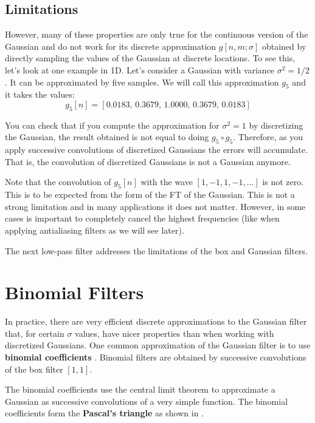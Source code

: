 \subsection{Limitations}

However, many of these properties are only true for the continuous version of the Gaussian and do not work for its discrete approximation $g\left[n,m;\sigma \right]$ obtained by directly sampling the values of the Gaussian at discrete locations. To see this, let's look at one example in 1D. Let's consider a Gaussian with variance $\sigma^2=1/2$. It can be approximated by five samples. We will call this approximation $g_5$ and it takes the values:
\begin{equation}
	g_5\left[ n \right] = \left[0.0183, \,    0.3679, \,    1.0000, \,    0.3679, \,    0.0183 \right]
\end{equation}

You can check that if you compute the approximation for $\sigma^2=1$ by discretizing the Gaussian, the result obtained is not equal to doing $g_5 \circ g_5$. Therefore, as you apply successive convolutions of discretized Gaussians the errors will accumulate. That is, the convolution of discretized Gaussians is not a Gaussian anymore.

Note that the convolution of $g_5\left[ n \right]$ with the wave $\left[1,-1,1,-1,...\right]$ is not zero. This is to be expected from the form of the FT of the Gaussian. This is not a strong limitation and in many applications it does not matter. However, in some cases is important to completely cancel the highest frequencies (like when applying antialiasing filters as we will see later).

The next low-pass filter addresses the limitations of the box and Gaussian filters.

\section{Binomial Filters}

In practice, there are very efficient discrete approximations to the Gaussian filter that, for certain $\sigma$ values, have nicer properties than when working with discretized Gaussians. One common approximation of the Gaussian filter is to use {\bf binomial coefficients} \cite{Chehikian91}. Binomial filters are obtained by successive convolutions of the box filter $\left[1,1\right]$.

The binomial coefficients use the central limit theorem to approximate a Gaussian as successive convolutions of a very simple function.
The binomial coefficients form the {\bf Pascal's triangle} as shown in \fig{\ref{fig:pascaltriangle}}.

